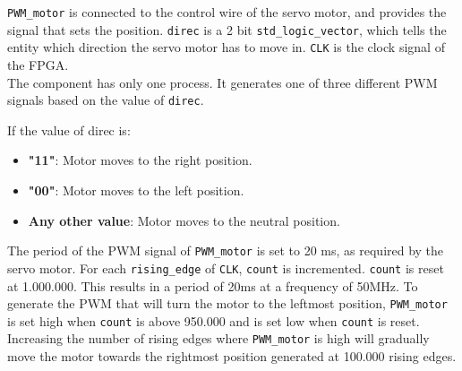 \texttt{PWM\_motor} is connected to the control wire of the servo motor, and provides the signal that sets the position. 
\texttt{direc} is a 2 bit \texttt{std\_logic\_vector}, which tells the entity which direction the servo motor has to move in. \texttt{CLK} is the clock signal of the FPGA. \\

The component has only one process. It generates one of three different PWM signals based on the value of \texttt{direc}. 

If the value of direc is: 
\begin{itemize}
\item \textbf{"11"}: Motor moves to the right position.
\item \textbf{"00"}: Motor moves to the left position.
\item \textbf{Any other value}: Motor moves to the neutral position.
\end{itemize}


The period of the PWM signal of \texttt{PWM\_motor} is set to  20 ms, as required by the servo motor.
For each  \texttt{rising\_edge} of \texttt{CLK}, \texttt{count} is incremented.
\texttt{count} is reset at 1.000.000. This results in a period of 20ms at a frequency of 50MHz. 
To generate the PWM that will turn the motor to the leftmost position, \texttt{PWM\_motor} is set high when \texttt{count} is above 950.000 and is set low when \texttt{count} is reset. Increasing the number of rising edges where \texttt{PWM\_motor} is high will gradually move the motor towards the rightmost position generated at 100.000 rising edges.



